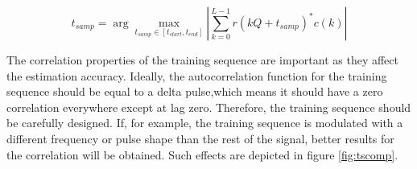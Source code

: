 \documentclass[12pt,a4paper,openright]{report}
\begin{document}
\begin{equation}
{t_{samp}} = \arg \mathop {\max }\limits_{{t_{samp}} \in [{t_{start}},{t_{end}}]} \left| {\sum\limits_{k = 0}^{L - 1} {r(kQ + {t_{samp}})^*c(k)} } \right|
\end{equation}

The correlation properties of the training sequence are important as they affect the estimation accuracy. Ideally, the autocorrelation function for the training sequence should be equal to a delta pulse,which means it should have a zero correlation everywhere except at lag zero. Therefore, the training sequence should be carefully designed. If, for example, the training sequence is modulated with a different frequency or pulse shape than the rest of the signal, better results for the correlation will be obtained. Such effects are depicted in figure \ref{fig:tscomp}. 
\end{document}
